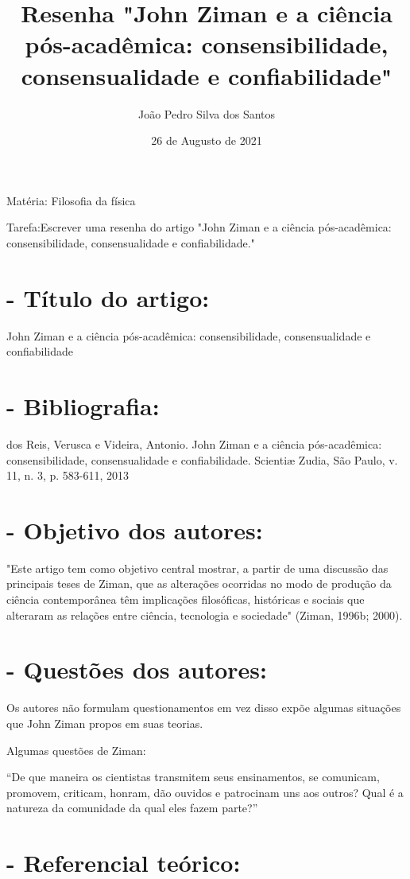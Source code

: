 \documentclass{article}
\title{Resenha "John Ziman e a ciência pós-acadêmica:
consensibilidade, consensualidade
e confiabilidade"}
\author{João Pedro Silva dos Santos}
\date{26 de Augusto de 2021}
\begin{document}
\maketitle

Matéria: Filosofia da física


Tarefa:Escrever uma resenha do artigo "John Ziman e a ciência pós-acadêmica: consensibilidade, consensualidade e confiabilidade."


\section*{- Título do artigo:}

John Ziman e a ciência pós-acadêmica: consensibilidade, consensualidade e confiabilidade

\section*{- Bibliografia:}

dos Reis, Verusca e Videira, Antonio. John Ziman e a ciência pós-acadêmica: consensibilidade, consensualidade e confiabilidade. Scientiæ Zudia, São Paulo, v. 11, n. 3, p. 583-611, 2013

\section*{- Objetivo dos autores:}

"Este artigo tem como objetivo central mostrar, a partir de uma discussão das principais teses de Ziman, que as alterações ocorridas no modo de produção da ciência contemporânea têm implicações filosóficas, históricas e sociais que alteraram as relações entre ciência, tecnologia e sociedade" (Ziman, 1996b; 2000).

\section*{- Questões dos autores:}

Os autores não formulam questionamentos em vez disso expõe algumas situações que John Ziman propos em suas teorias.

Algumas questões de Ziman:

“De que maneira os cientistas transmitem seus ensinamentos, se comunicam, promovem, criticam, honram, dão ouvidos e patrocinam uns aos outros? Qual é a natureza da comunidade da qual eles fazem parte?”

\section*{- Referencial teórico:}
\end{document}
